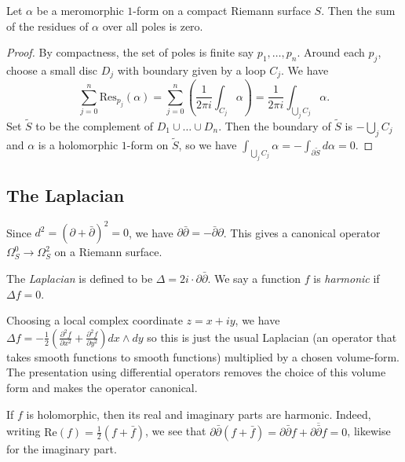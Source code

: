 \begin{proposition}
    Let \(\alpha\) be a meromorphic \(1\)-form on a compact Riemann surface
    \(S\). Then the sum of the residues of \(\alpha\) over all poles is zero.

    \begin{proof}
        By compactness, the set of poles is finite say \(p_1,\ldots,p_n\). Around
        each \(p_j\), choose a small disc \(D_j\) with boundary given by a loop
        \(C_j\). We have
        \[\sum_{j=0}^n \text{Res}_{p_j}(\alpha)= \sum_{j=0}^n \left(
        \frac{1}{2\pi i}\int_{C_j}\alpha \right) =\frac{1}{2\pi
        i}\int_{\bigcup_j C_j} \alpha.\]
        Set \(\tilde S\) to be the complement of \(D_1\cup \ldots \cup D_n\). Then
        the boundary of \(\tilde{S}\) is \(-\bigcup_j C_j\) and \(\alpha\) is a
        holomorphic \(1\)-form on \(\tilde S\), so we have
        \(\int_{\bigcup_jC_j}\alpha = -\int_{\partial\tilde S}d\alpha = 0\).
    \end{proof}
\end{proposition}

\subsection{The Laplacian}
Since \(d^2=(\partial +\bar\partial)^2=0\), we have \(\partial \bar\partial =
-\bar\partial \partial\). This gives a canonical operator \(\Omega^0_S\to
\Omega^2_S\) on a Riemann surface.

\begin{definition}
    The \textit{Laplacian} is defined to be \(\Delta=2i\cdot
    \partial\bar\partial \). We say a function \(f\) is \textit{harmonic} if \(\Delta f=0\).
\end{definition}

Choosing a local complex coordinate \(z=x+iy\), we have \(\Delta f =
-\frac{1}{2}(\frac{\partial^2 f}{\partial x^2} + \frac{\partial^2 f}{\partial
y^2})dx\wedge dy\) so this is just the usual Laplacian (an operator that takes
smooth functions to smooth functions) multiplied by a chosen volume-form. The
presentation using differential operators removes the choice of this volume
form and makes the operator canonical.

If \(f\) is holomorphic, then its real and imaginary parts are harmonic.
Indeed, writing \(\text{Re}(f)=\frac{1}{2}(f+\bar f)\), we see that
\(\partial\bar\partial (f+\bar f)=\partial \bar \partial  f +
\overline{\partial \bar\partial f}=0\), likewise for the imaginary part.

